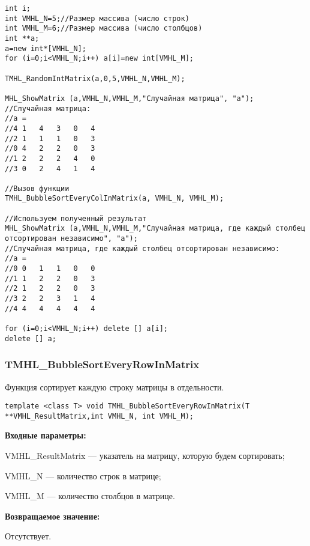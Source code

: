 \documentclass[a4paper,12pt]{article}
\begin{document}
\begin{lstlisting}[label=code_use_TMHL_BubbleSortEveryColInMatrix,caption=Пример использования]
int i;
int VMHL_N=5;//Размер массива (число строк)
int VMHL_M=6;//Размер массива (число столбцов)
int **a;
a=new int*[VMHL_N];
for (i=0;i<VMHL_N;i++) a[i]=new int[VMHL_M];

TMHL_RandomIntMatrix(a,0,5,VMHL_N,VMHL_M);

MHL_ShowMatrix (a,VMHL_N,VMHL_M,"Случайная матрица", "a");
//Случайная матрица:
//a =
//4	1	4	3	0	4
//2	1	1	1	0	3
//0	4	2	2	0	3
//1	2	2	2	4	0
//3	0	2	4	1	4

//Вызов функции
TMHL_BubbleSortEveryColInMatrix(a, VMHL_N, VMHL_M);

//Используем полученный результат
MHL_ShowMatrix (a,VMHL_N,VMHL_M,"Случайная матрица, где каждый столбец отсортирован независимо", "a");
//Случайная матрица, где каждый столбец отсортирован независимо:
//a =
//0	0	1	1	0	0
//1	1	2	2	0	3
//2	1	2	2	0	3
//3	2	2	3	1	4
//4	4	4	4	4	4

for (i=0;i<VMHL_N;i++) delete [] a[i];
delete [] a;
\end{lstlisting}

\subsubsection{TMHL\_BubbleSortEveryRowInMatrix}\label{TMHL_BubbleSortEveryRowInMatrix}

Функция сортирует каждую строку матрицы в отдельности.


\begin{lstlisting}[label=code_syntax_TMHL_BubbleSortEveryRowInMatrix,caption=Синтаксис]
template <class T> void TMHL_BubbleSortEveryRowInMatrix(T **VMHL_ResultMatrix,int VMHL_N, int VMHL_M);
\end{lstlisting}

\textbf{Входные параметры:}
 
VMHL\_ResultMatrix --- указатель на матрицу, которую будем сортировать;
 
VMHL\_N --- количество строк в матрице;
 
VMHL\_M --- количество столбцов в матрице.

\textbf{Возвращаемое значение:}

Отсутствует.
\end{document}
